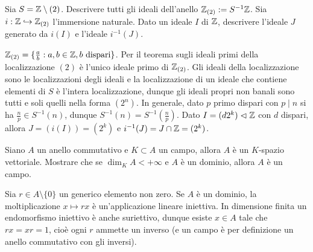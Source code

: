 \begin{exercise}
    Sia $S = \mathbb{Z} \setminus (2)$. Descrivere tutti gli ideali dell'anello $\mathbb{Z}_{(2)} := S^{-1}\mathbb{Z}$. Sia $i : \mathbb{Z} \hookrightarrow \mathbb{Z}_{(2)}$ l'immersione naturale. Dato un ideale $I$ di $\mathbb{Z}$, descrivere l'ideale $J$ generato da $i(I)$ e l'ideale $i^{-1}(J)$.
\end{exercise}
\begin{solution}
    $\mathbb{Z}_{(2)} = \{ \frac{a}{b} : a, b \in \mathbb{Z}, b \text{ dispari} \}$. Per il teorema sugli ideali primi della localizzazione $(2)$ è l'unico ideale primo di $\mathbb{Z}_{(2)}$. Gli ideali della localizzazione sono le localizzazioni degli ideali e la localizzazione di un ideale che contiene elementi di $S$ è l'intera localizzazione, dunque gli ideali propri non banali sono tutti e soli quelli nella forma $(2^n)$.
    In generale, dato $p$ primo dispari con $p \mid n$ si ha $\frac{n}{p} \in S^{-1}(n)$, dunque $S^{-1}(n) = S^{-1}(\frac{n}{p})$. Dato $I = (d 2^k) \vartriangleleft \mathbb{Z}$ con $d$ dispari, allora $J = (i(I)) = (2^k)$ e $i^{-1}(J) = J \cap \mathbb{Z} = (2^k)$.
\end{solution}

\begin{exercise}
    Siano $A$ un anello commutativo e $K \subset A$ un campo, allora $A$ è un $K$-spazio vettoriale. Mostrare che se $\dim_K A < +\infty$ e $A$ è un dominio, allora $A$ è un campo. 
\end{exercise}
\begin{solution}
    Sia $r \in A \setminus \{0\}$ un generico elemento non zero. Se $A$ è un dominio, la moltiplicazione $x \mapsto rx$ è un'applicazione lineare iniettiva. In dimensione finita un endomorfismo iniettivo è anche suriettivo, dunque esiste $x \in A$ tale che $rx = xr = 1$, cioè ogni $r$ ammette un inverso (e un campo è per definizione un anello commutativo con gli inversi).
\end{solution}
